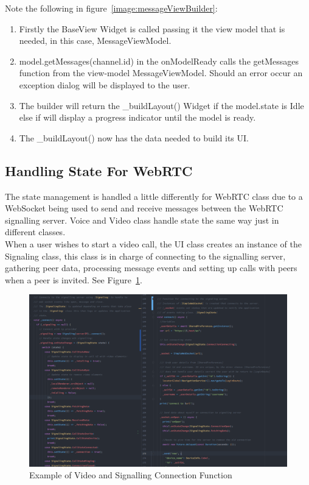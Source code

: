 Note the following in figure~\ref{image:messageViewBuilder}:
\begin{enumerate}
	\item Firstly the BaseView Widget is called passing it the view model that is needed, in this case, MessageViewModel.
	\item model.getMessages(channel.id) in the onModelReady calls the getMessages function from the view-model MessageViewModel. Should an error occur an exception dialog will be displayed to the user.
	\item The builder will return the \_buildLayout() Widget if the model.state is Idle else if will display a progress indicator until the model is ready.
	\item The \_buildLayout() now has the data needed to build its UI.
\end{enumerate}

\subsection{Handling State For WebRTC}
\label{handleStateWebRTC}
The state management is handled a little differently for WebRTC class due to a WebSocket being used to send and receive messages between the WebRTC signalling server. Voice and Video class handle state the same way just in different classes.
\\ When a user wishes to start a video call, the UI class creates an instance of the Signaling class, this class is in charge of connecting to the signalling server, gathering peer data, processing message events and setting up calls with peers when a peer is invited. See Figure~\ref{image:videoSignallingConnectFunc}.
\begin{figure}[h!]
    \caption{Example of Video and Signalling Connection Function}
    \label{image:videoSignallingConnectFunc}
    \centering
    \includegraphics[width=1.0\textwidth]{images/video_and_signalling_connect_fcuntions.png}
\end{figure}

